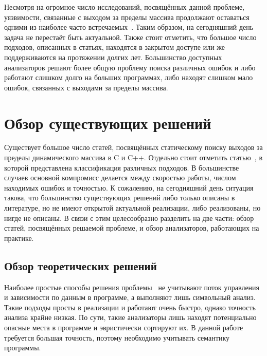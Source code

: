 Несмотря на огромное число исследований, посвящённых данной проблеме,
уязвимости, связанные с выходом за пределы массива продолжают
оставаться одними из наиболее часто встречаемых~\cite{uscert}. Таким
образом, на сегодняшний день задача не перестаёт быть
актуальной. Также стоит отметить, что большое число подходов,
описанных в статьях, находятся в закрытом доступе или же
поддерживаются на протяжении долгих лет. Большинство доступных
анализаторов решают более общую проблему поиска различных ошибок и
либо работают слишком долго на больших программах, либо находят
слишком мало ошибок, связанных с выходами за пределы массива.

\section{Обзор существующих решений}

Существует большое число статей, посвящённых статическому поиску
выходов за пределы динамического массива в C и C++. Отдельно стоит
отметить статью~\cite{shahriar2010classification}, в которой
представлена классификация различных подходов. В большинстве случаев
основной компромисс делается между скоростью работы, числом находимых
ошибок и точностью. К сожалению, на сегодняшний день ситуация такова,
что большинство существующих решений либо только описаны в литературе,
но не имеют открытой актуальной реализации, либо реализованы, но нигде
не описаны. В связи с этим целесообразно разделить на две части: обзор
статей, посвящённых решаемой проблеме, и обзор анализаторов,
работающих на практике.

\subsection{Обзор теоретических решений}

Наиболее простые способы решения
проблемы~\cite{viega2002token,flawfinder} не учитывают поток
управления и зависимости по данным в программе, а выполняют лишь
символьный анализ. Такие подходы просты в реализации и работают очень
быстро, однако точность анализа крайне низкая. По сути, такие
анализаторы лишь находят потенциально опасные места в программе и
эвристически сортируют их. В данной работе требуется большая точность,
поэтому необходимо учитывать семантику программы.

